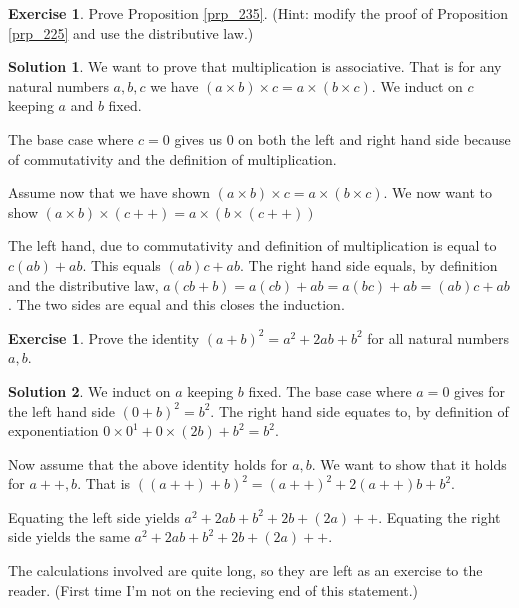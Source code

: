 \documentclass[a4paper, twocolumn]{report}
\newcounter{exercise} \numberwithin{exercise}{section}
\theoremstyle{definition}
\newtheorem{exc}[exercise]{Exercise}
\theoremstyle{solution}
\newtheorem*{sltn}{Solution}
\newcommand{\dplus}{{+}{+}} %
\begin{document}
\begin{exc}
  Prove Proposition \ref{prp_235}. (Hint: modify the proof of Proposition
  \ref{prp_225} and use the distributive law.) 
\end{exc}

\begin{sltn}
  We want to prove that multiplication is associative.
  That is for any natural numbers $a, b, c$ we have $(a\times b)\times c = a \times (b \times c)$.
  We induct on $c$ keeping $a$ and $b$ fixed.

  The base case where $c = 0$ gives us $0$ on both the left and right hand side
  because of commutativity and the definition of multiplication.

  Assume now that we have shown $(a\times b)\times c = a \times (b \times c)$. We now want to show
  $(a\times b)\times (c\dplus) = a \times (b \times (c\dplus))$

  The left hand, due to commutativity and definition of multiplication is equal
  to $c(ab) + ab$.  This equals $(ab)c + ab$. The right hand side equals, by
  definition and the distributive law, $a(cb + b) = a(cb) + ab = a(bc) + ab = (ab)c + ab$. The two sides
  are equal and this closes the induction.  

\end{sltn}

\begin{exc}
  Prove the identity $\left( a + b \right)^{2} = a^{2} + 2ab + b^{2}$ for all
  natural numbers $a, b$. 
\end{exc}
\begin{sltn}
  We induct on $a$ keeping $b$ fixed.  The base case where $a = 0$ gives for
  the left hand side $(0 + b)^{2} = b^{2}$.  The right hand side equates to, by
  definition of exponentiation $0\times 0^{1} + 0\times(2b) + b^{2} = b^2$.

  Now assume that the above identity holds for $a, b$. We want to show that it holds for
  $a\dplus, b$.
  That is $\left( (a\dplus) + b  \right)^{2} = (a\dplus)^{2} + 2(a\dplus)b + b^{2}$.

  Equating the left side yields $a^{2} + 2ab + b^{2} + 2b + (2a)\dplus$.
  Equating the right side yields the same $a^{2} + 2ab + b^2 + 2b + (2a)\dplus$.

  The calculations involved are quite long, so they are left as an exercise to
  the reader. (First time I'm not on the recieving end of this statement.)
\end{sltn}
\end{document}
